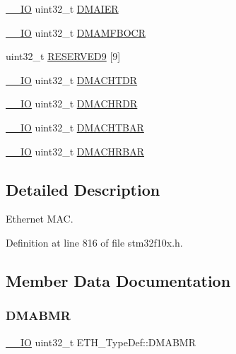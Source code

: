 \begin{DoxyCompactItemize}
\item 
\hyperlink{core__sc300_8h_aec43007d9998a0a0e01faede4133d6be}{\+\_\+\+\_\+\+IO} uint32\+\_\+t \hyperlink{struct_e_t_h___type_def_af35764e78c9cb2a8743822f63134ef42}{D\+M\+A\+I\+ER}
\item 
\hyperlink{core__sc300_8h_aec43007d9998a0a0e01faede4133d6be}{\+\_\+\+\_\+\+IO} uint32\+\_\+t \hyperlink{struct_e_t_h___type_def_aa031754e61b60bbbec393be19fb30036}{D\+M\+A\+M\+F\+B\+O\+CR}
\item 
uint32\+\_\+t \hyperlink{struct_e_t_h___type_def_a57a4c0f1bc5e8dd706e5951c59d29eb8}{R\+E\+S\+E\+R\+V\+E\+D9} \mbox{[}9\mbox{]}
\item 
\hyperlink{core__sc300_8h_aec43007d9998a0a0e01faede4133d6be}{\+\_\+\+\_\+\+IO} uint32\+\_\+t \hyperlink{struct_e_t_h___type_def_ab02310e389320a383022b666af621ba9}{D\+M\+A\+C\+H\+T\+DR}
\item 
\hyperlink{core__sc300_8h_aec43007d9998a0a0e01faede4133d6be}{\+\_\+\+\_\+\+IO} uint32\+\_\+t \hyperlink{struct_e_t_h___type_def_ab4a222f725cc43952993519b20466637}{D\+M\+A\+C\+H\+R\+DR}
\item 
\hyperlink{core__sc300_8h_aec43007d9998a0a0e01faede4133d6be}{\+\_\+\+\_\+\+IO} uint32\+\_\+t \hyperlink{struct_e_t_h___type_def_abb2eba5ee2a1621abeeb59e3aadc0318}{D\+M\+A\+C\+H\+T\+B\+AR}
\item 
\hyperlink{core__sc300_8h_aec43007d9998a0a0e01faede4133d6be}{\+\_\+\+\_\+\+IO} uint32\+\_\+t \hyperlink{struct_e_t_h___type_def_a03160db5ffae457bab55c0358c4ef998}{D\+M\+A\+C\+H\+R\+B\+AR}
\end{DoxyCompactItemize}


\subsection{Detailed Description}
Ethernet M\+AC. 

Definition at line 816 of file stm32f10x.\+h.



\subsection{Member Data Documentation}
\mbox{\label{struct_e_t_h___type_def_a32b1c260b8ab0b3f67cbfa97f4d910d1}} 
\subsubsection{\texorpdfstring{D\+M\+A\+B\+MR}{DMABMR}}
{\footnotesize\ttfamily \hyperlink{core__sc300_8h_aec43007d9998a0a0e01faede4133d6be}{\+\_\+\+\_\+\+IO} uint32\+\_\+t E\+T\+H\+\_\+\+Type\+Def\+::\+D\+M\+A\+B\+MR}



